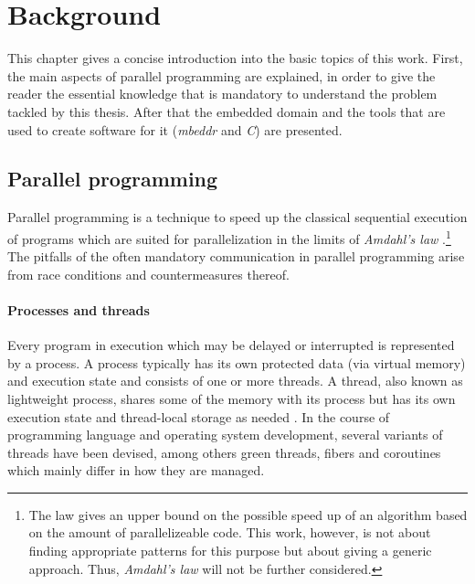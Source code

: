 \chapter{Background}
This chapter gives a concise introduction into the basic topics of this work. First, the main aspects of parallel programming are explained, in order to give the reader the essential knowledge that is mandatory to understand the problem tackled by this thesis. After that the embedded domain and the tools that are used to create software for it (\textit{mbeddr} and \textit{C}) are presented.

\section{Parallel programming}
Parallel programming is a technique to speed up the classical sequential execution of programs which are suited for parallelization in the limits of \textit{Amdahl's law} \cite[p.~61]{IntroductionToParallelProgramming}.\footnote{The law gives an upper bound on the possible speed up of an algorithm based on the amount of parallelizeable code. This work, however, is not about finding appropriate patterns for this purpose but about giving a generic approach. Thus, \textit{Amdahl's law} will not be further considered.} The pitfalls of the often mandatory communication in parallel programming arise from race conditions and countermeasures thereof.

\subsubsection{Processes and threads}
Every program in execution which may be delayed or interrupted is represented by a process. A process typically has its own protected data (via virtual memory) and execution state and consists of one or more threads. A thread, also known as lightweight process, shares some of the memory with its process but has its own execution state and thread-local storage as needed \cite[p.~20]{PrinciplesOfModernOSs}. In the course of programming language and operating system development, several variants of threads have been devised, among others green threads, fibers and coroutines which mainly differ in how they are managed.

